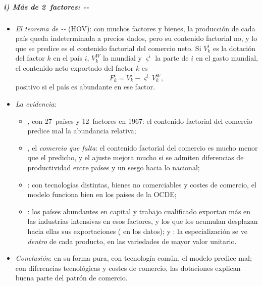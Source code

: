 \documentclass[11pt]{article}
\begin{document}
\subparagraph{i) Más de 2~factores: --}

\begin{itemize}

\item \emph{El teorema de --} (HOV)\nocite{Vanek1968Factor}: con muchos factores y bienes, la producción de cada país queda indeterminada a precios dados, pero su contenido factorial no\nocite{Ethier1984Higher}, y lo que se predice es el contenido factorial del comercio neto. Si $V_k^i$ es la dotación del factor $k$ en el país $i$, $V_k^W$ la mundial y $\varsigma^i$ la parte de $i$ en el gasto mundial, el contenido neto exportado del factor $k$ es
  \begin{equation}\label{eq:hov}
  F_k^i=V_k^i-\varsigma^i\,V_k^W,
  \end{equation}
  positivo si el país es abundante en ese factor.
\item \emph{La evidencia}:
  \begin{itemize}
  \item \textcite{BowenLeamerSveikauskas1987Multicountry}, con 27~países y 12~factores en 1967: el contenido factorial del comercio predice mal la abundancia relativa;
  \item \textcite{Trefler1995Case}, el \emph{comercio que falta}: el contenido factorial del comercio es mucho menor que el predicho, y el ajuste mejora mucho si se admiten diferencias de productividad entre países y un sesgo hacia lo nacional;
  \item \textcite{DavisWeinstein2001Account}: con tecnologías distintas, bienes no comerciables y costes de comercio, el modelo funciona bien en los países de la OCDE;
  \item \textcite{Romalis2004Factor}: los países abundantes en capital y trabajo cualificado exportan más en las industrias intensivas en esos factores, y los que los acumulan desplazan hacia ellas sus exportaciones ( en los datos); y \textcite{Schott2004Across}: la especialización se ve \emph{dentro} de cada producto, en las variedades de mayor valor unitario.
  \end{itemize}
\item \emph{Conclusión}: en su forma pura, con tecnología común, el modelo predice mal; con diferencias tecnológicas y costes de comercio, las dotaciones explican buena parte del patrón de comercio.
\end{itemize}
\end{document}
